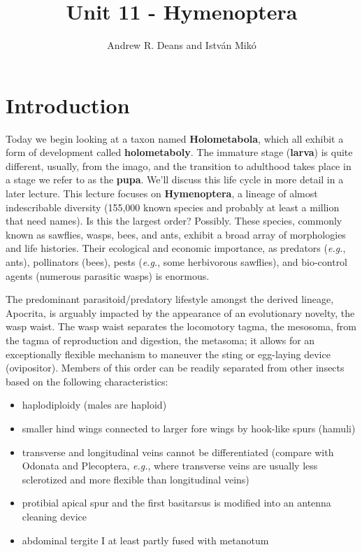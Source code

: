 \documentclass[letterpaper, 11pt]{article}
\title{Unit 11 - Hymenoptera}
\author{Andrew R. Deans and Istv\'an Mik\'o}
\begin{document}
\cleanlookdateon %
\maketitle
\thispagestyle{fancy}
\section*{Introduction}
Today we begin looking at a taxon named \textbf{Holometabola}, which all exhibit a form of development called \textbf{holometaboly}. The immature stage (\textbf{larva}) is quite different, usually, from the imago, and the transition to adulthood takes place in a stage we refer to as the \textbf{pupa}. We'll discuss this life cycle in more detail in a later lecture. This lecture focuses on \textbf{Hymenoptera}, a lineage of almost indescribable diversity (155,000 known species and probably at least a million that need names). Is this the largest order? Possibly. These species, commonly known as sawflies, wasps, bees, and ants, exhibit a broad array of morphologies and life histories. Their ecological and economic importance, as predators (\textit{e.g.}, ants), pollinators (bees), pests (\textit{e.g.}, some herbivorous sawflies), and bio-control agents (numerous parasitic wasps) is enormous. 

The predominant parasitoid/predatory lifestyle amongst the derived lineage, Apocrita, is arguably impacted by the appearance of an evolutionary novelty, the wasp waist. The wasp waist separates the locomotory tagma, the mesosoma, from the tagma of reproduction and digestion, the metasoma; it allows for an exceptionally flexible mechanism to maneuver the sting or egg-laying device (ovipositor). Members of this order can be readily separated from other insects based on the following characteristics:

\begin{itemize}
\item haplodiploidy (males are haploid)
\item smaller hind wings connected to larger fore wings by hook-like spurs (hamuli)
\item transverse and longitudinal veins cannot be differentiated (compare with Odonata and Plecoptera, \textit{e.g.}, where transverse veins are usually less sclerotized and more flexible than longitudinal veins)
\item protibial apical spur and the first basitarsus is modified into an antenna cleaning device
\item abdominal tergite I at least partly fused with metanotum
\end{itemize}
\end{document}
